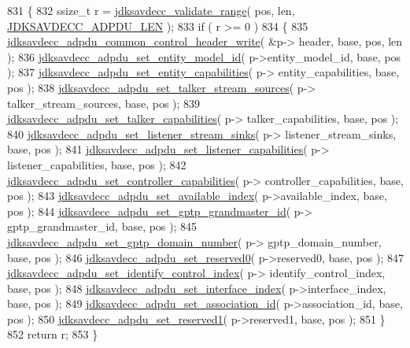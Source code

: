 \begin{DoxyCode}
831 \{
832     ssize\_t r = \hyperlink{group__util_ga9c02bdfe76c69163647c3196db7a73a1}{jdksavdecc\_validate\_range}( pos, len, 
      \hyperlink{group__adpdu_gabe529d24b7763823bb8536b1b50b2dcc}{JDKSAVDECC\_ADPDU\_LEN} );
833     \textcolor{keywordflow}{if} ( r >= 0 )
834     \{
835         \hyperlink{group__adpdu_ga6c65125a66fce45f38751f7c6731254d}{jdksavdecc\_adpdu\_common\_control\_header\_write}( &p->
      header, base, pos, len );
836         \hyperlink{group__adpdu_gaae7c3e50a01e59b2b1e67f9d5a276cb6}{jdksavdecc\_adpdu\_set\_entity\_model\_id}( p->entity\_model\_id, base,
       pos );
837         \hyperlink{group__adpdu_gababa29423e2e609fc7d4886a8aea177a}{jdksavdecc\_adpdu\_set\_entity\_capabilities}( p->
      entity\_capabilities, base, pos );
838         \hyperlink{group__adpdu_ga8c9bda13234d80b2679aca9a06c05bd7}{jdksavdecc\_adpdu\_set\_talker\_stream\_sources}( p->
      talker\_stream\_sources, base, pos );
839         \hyperlink{group__adpdu_ga5f3e3ff9e1bb5039cf83ff024b8d3b2f}{jdksavdecc\_adpdu\_set\_talker\_capabilities}( p->
      talker\_capabilities, base, pos );
840         \hyperlink{group__adpdu_ga5e4e240b114ca3a2be04a806e2c515e2}{jdksavdecc\_adpdu\_set\_listener\_stream\_sinks}( p->
      listener\_stream\_sinks, base, pos );
841         \hyperlink{group__adpdu_ga8ac520cff2dc184f6b03c0253a851ac9}{jdksavdecc\_adpdu\_set\_listener\_capabilities}( p->
      listener\_capabilities, base, pos );
842         \hyperlink{group__adpdu_ga9d15795ea7ee0739da8559090662069a}{jdksavdecc\_adpdu\_set\_controller\_capabilities}( p->
      controller\_capabilities, base, pos );
843         \hyperlink{group__adpdu_ga05b3c0d4bfedfb7ca01d24a206619c69}{jdksavdecc\_adpdu\_set\_available\_index}( p->available\_index, base,
       pos );
844         \hyperlink{group__adpdu_ga69792f231564786261d00109e34f9623}{jdksavdecc\_adpdu\_set\_gptp\_grandmaster\_id}( p->
      gptp\_grandmaster\_id, base, pos );
845         \hyperlink{group__adpdu_ga085c2da55db6ab9c3a55135585bd8f09}{jdksavdecc\_adpdu\_set\_gptp\_domain\_number}( p->
      gptp\_domain\_number, base, pos );
846         \hyperlink{group__adpdu_gae94258bc6f68ece2c34df783d72a32cf}{jdksavdecc\_adpdu\_set\_reserved0}( p->reserved0, base, pos );
847         \hyperlink{group__adpdu_ga8f13fff0b0e17122809c6fb2f089c1c2}{jdksavdecc\_adpdu\_set\_identify\_control\_index}( p->
      identify\_control\_index, base, pos );
848         \hyperlink{group__adpdu_ga651dcd9fd5b18884b0b86d0c8d32b3ec}{jdksavdecc\_adpdu\_set\_interface\_index}( p->interface\_index, base,
       pos );
849         \hyperlink{group__adpdu_gaf4bccd19420ecaf3e6e6af60d65b7960}{jdksavdecc\_adpdu\_set\_association\_id}( p->association\_id, base, 
      pos );
850         \hyperlink{group__adpdu_ga893e8d0562062deb4633add9cd760f24}{jdksavdecc\_adpdu\_set\_reserved1}( p->reserved1, base, pos );
851     \}
852     \textcolor{keywordflow}{return} r;
853 \}
\end{DoxyCode}


